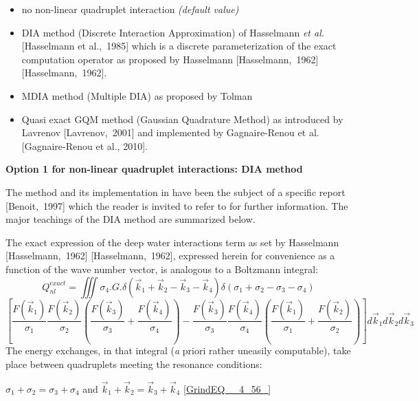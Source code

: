 \begin{itemize}
\item  no non-linear quadruplet interaction \textit{(default value)}

\item  DIA method (Discrete Interaction Approximation) of Hasselmann \textit{et al.} [Hasselmann et al.,~1985] which is a discrete parameterization of the exact computation operator as proposed by Hasselmann [Hasselmann,~1962] [Hasselmann,~1962].

\item  MDIA method (Multiple DIA) as proposed by Tolman \cite{Tolman2004}

\item  Quasi exact GQM method (Gaussian Quadrature Method) as introduced by Lavrenov [Lavrenov,~2001] and implemented by Gagnaire-Renou et al. [Gagnaire-Renou et al., 2010].
\end{itemize}


{\bf  Option 1 for non-linear quadruplet interactions: DIA method}

 The method and its implementation in \tomawac have been the subject of a specific report [Benoit,~1997] which the reader is invited to refer to for further information. The major teachings of the DIA method are summarized below.

 The exact expression of the deep water interactions term as set by Hasselmann [Hasselmann,~1962] [Hasselmann,~1962], expressed herein for convenience as a function of the wave number vector, is analogous to a Boltzmann integral:
\[Q_{nl}^{exact} =\iiint  \sigma _{4} .G.\delta \left(\vec{k}_{1} +\vec{k}_{2} -\vec{k}_{3} -\vec{k}_{4} \right)\delta \left(\sigma _{1} +\sigma _{2} -\sigma _{3} -\sigma _{4} \right)\]
\begin{equation} \label{GrindEQ__4_55_}
\left[\frac{F(\vec{k}_{1} )}{\sigma _{1} } \frac{F(\vec{k}_{2} )}{\sigma _{2} } \left(\frac{F(\vec{k}_{3} )}{\sigma _{3} } +\frac{F(\vec{k}_{4} )}{\sigma _{4} } \right)-\frac{F(\vec{k}_{3} )}{\sigma _{3} } \frac{F(\vec{k}_{4} )}{\sigma _{4} } \left(\frac{F(\vec{k}_{1} )}{\sigma _{1} } +\frac{F(\vec{k}_{2} )}{\sigma _{2} } \right)\right]d\vec{k}_{1} d\vec{k}_{2} d\vec{k}_{3}
\end{equation}
The energy exchanges, in that integral (\textit{a }priori rather uneasily computable), take place between quadruplets meeting the resonance conditions:

$\sigma _{1} +\sigma _{2} =\sigma _{3} +\sigma _{4} $  and  $\vec{k}_{1} +\vec{k}_{2} =\vec{k}_{3} +\vec{k}_{4} $ \eqref{GrindEQ__4_56_}

